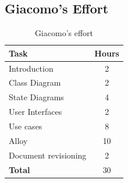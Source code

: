 \documentclass[10pt]{article}
\begin{document}
\subsection{Giacomo's Effort}
\begin{table}[h!]
    \begin{center}
    \begin{tabular}{|l|c|}
    \hline
    \textbf{Task} & \textbf{Hours} \\
    \hline
    Introduction & 2 \\
    Class Diagram & 2 \\
    State Diagrams & 4 \\
    User Interfaces & 2 \\
    Use cases & 8 \\
    Alloy & 10 \\
    Document revisioning & 2 \\
    \hline
    \hline
    \textbf{Total} & 30 \\
    \hline
    \end{tabular}
    \end{center}
    \caption{Giacomo's effort}
\end{table}

\end{document}
